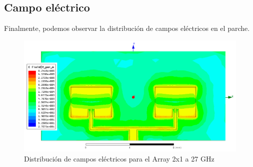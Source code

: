 \newpage
\subsection{Campo eléctrico}
\par Finalmente, podemos observar la distribución de campos eléctricos en el parche. 
\begin{figure}[H]
    \centering
        \includegraphics[width=\textwidth]{archivos/analisis/2x13/8}
        \caption{Distribución de campos eléctricos para el Array 2x1 a 27 GHz}
        \label{fig:elec2x13}
\end{figure}


